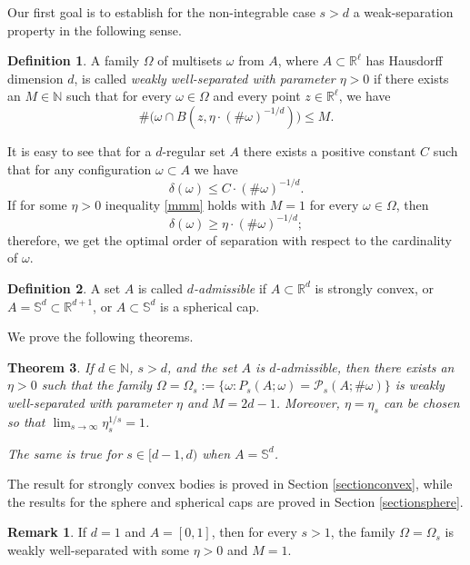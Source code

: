 \documentclass[12pt]{amsart}
\newtheorem{theorem}{Theorem}[section]
\theoremstyle{definition}
\newtheorem*{rem*}{Remark}
\newtheorem{defin}[theorem]{Definition}
\def\R{\mathbb{R}}
\newcommand{\1}{\mathbf{1}}
\newcommand{\PP}{\mathcal{P}}
\renewcommand\S{\mathbb{S}}
\begin{document}
Our first goal is to establish for the non-integrable case $s>d$ a weak-separation property in the following sense.
 
\begin{defin}
A family $\Omega$ of multisets $\omega$ from $A$, where $A\subset \R^\ell$ has Hausdorff dimension $d$, is called {\it weakly well-separated with parameter $\eta>0$} if there exists an $M\in \mathbb{N}$ such that for every $\omega\in \Omega$ and every point $z\in \R^\ell$, we have
\begin{equation}\label{mmm}
\#\big(\omega \cap B(z, \eta \cdot (\#\omega)^{-1/d})\Big) \leqslant M.
\end{equation}
\end{defin}
It is easy to see that for a $d$-regular set $A$ there exists a positive constant $C$ such that for any configuration $\omega\subset A$ we have
\begin{equation}
\delta(\omega)\leqslant C\cdot (\#\omega)^{-1/d}.
\end{equation}
If for some $\eta>0$ inequality \eqref{mmm} holds with $M=1$ for every $\omega\in \Omega$, then
$$
\delta(\omega)\geqslant \eta \cdot (\#\omega)^{-1/d};
$$
therefore, we get the optimal order of separation with respect to the cardinality of $\omega$. 

\bigskip

\begin{defin}
A set $A$ is called {\it $d$-admissible} if $A\subset \R^d$ is strongly convex, or $A=\S^d\subset \R^{d+1}$, or $A\subset \S^d$ is a spherical cap.
\end{defin}
We prove the following theorems.
\begin{theorem}\label{thsepar}
If $d\in \mathbb{N}$, $s>d$, and the set $A$ is $d$-admissible, then there exists an $\eta>0$ such that the family $\Omega=\Omega_s:=\{\omega\colon P_s(A; \omega)=\PP_s(A; \#\omega)\}$ is weakly well-separated with parameter $\eta$ and $M=2d-1$.
Moreover, $\eta=\eta_s$ can be chosen so that $\lim_{s\to \infty} \eta_s^{1/s}=1$.

The same is true for $s\in [d-1,d)$ when $A=\S^d$.
\end{theorem}
The result for strongly convex bodies is proved in Section \ref{sectionconvex}, while the results for the sphere and spherical caps are proved in Section \ref{sectionsphere}.

\begin{rem*}
If $d=1$ and $A=[0,1]$, then for every $s>1$, the family $\Omega=\Omega_s$ is weakly well-separated with some $\eta>0$ and $M=1$.
\end{rem*}
\end{document}
